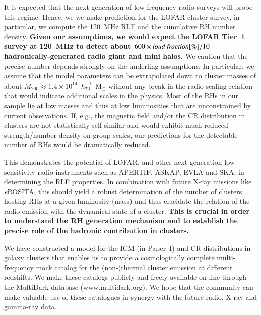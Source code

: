 \documentclass[useAMS,usenatbib]{mn2e}
\begin{document}
It is expected that the next-generation of low-frequency radio surveys will
probe this regime. Hence, we we make prediction for the LOFAR cluster survey, in
particular, we compute the 120~MHz RLF and the cumulative RH number
density. {\bf Given our assumptions, we would expect the LOFAR Tier~1 survey at
120~MHz to detect about $600\times{\mathrm{\emph{loud~fraction}[\%]/10}}$ 
hadronically-generated radio giant and mini halos.} 
We caution that the precise number depends strongly on the underling assumptions. 
In particular, we assume that the model parameters can be extrapolated down to cluster 
masses of about $M_{200}\approx1.4\times10^{14}$~$h_{70}^{-1}$~M$_{\odot}$ without 
any break in the radio scaling relation that would indicate additional scales in the physics.
Most of the RHs in our sample lie at low masses and thus at low luminosities
that are unconstrained by current observations. If, e.g., the magnetic field
and/or the CR distribution in clusters are not statistically self-similar and
would exhibit much reduced strength/number density on group scales, our
predictions for the detectable number of RHs would be dramatically reduced.

This demonstrates the potential of LOFAR, and other next-generation
low-sensitivity radio instruments such as APERTIF, ASKAP, EVLA and SKA, in
determining the RLF properties. In combination with future X-ray missions like
\emph{e}ROSITA, this should yield a robust determination of the number of
clusters hosting RHs at a given luminosity (mass) and thus elucidate the
relation of the radio emission with the dynamical state of a cluster.
{\bf This is crucial in order to understand the RH generation mechanism and to
establish the precise role of the hadronic contribution in clusters.}

We have constructed a model for the ICM (in Paper~I) and CR distributions 
in galaxy clusters that enables us to provide a cosmologically complete multi-frequency mock 
catalog for the \mbox{(non-)thermal} cluster emission at different redshifts. We make these 
catalogs publicly and freely available on-line through the MultiDark database (www.multidark.org). 
We hope that the community can make valuable use of these catalogues in
synergy with the future radio, X-ray and gamma-ray data.


\end{document}
